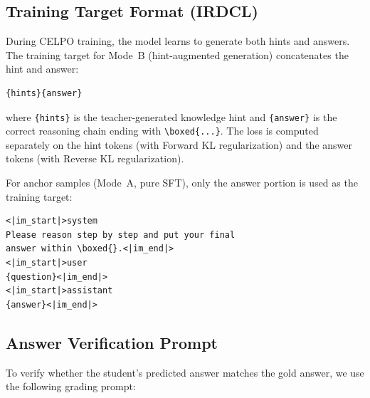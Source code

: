 \subsection{Training Target Format (IRDCL)}\label{app:training-target}

During CELPO training, the model learns to generate both hints and answers. The training target for Mode~B (hint-augmented generation) concatenates the hint and answer:

\begin{tcolorbox}[colback=orange!3, colframe=orange!40, title=Training Target Format (Mode B)]
\begin{verbatim}
{hints}{answer}
\end{verbatim}
\end{tcolorbox}

\noindent where \texttt{\{hints\}} is the teacher-generated knowledge hint and \texttt{\{answer\}} is the correct reasoning chain ending with \verb|\boxed{...}|. The loss is computed separately on the hint tokens (with Forward KL regularization) and the answer tokens (with Reverse KL regularization).

For anchor samples (Mode~A, pure SFT), only the answer portion is used as the training target:

\begin{tcolorbox}[colback=orange!3, colframe=orange!40, title=Training Target Format (Mode A / Anchor)]
\begin{verbatim}
<|im_start|>system
Please reason step by step and put your final 
answer within \boxed{}.<|im_end|>
<|im_start|>user
{question}<|im_end|>
<|im_start|>assistant
{answer}<|im_end|>
\end{verbatim}
\end{tcolorbox}

\subsection{Answer Verification Prompt}\label{app:verify-prompt}

To verify whether the student's predicted answer matches the gold answer, we use the following grading prompt:

